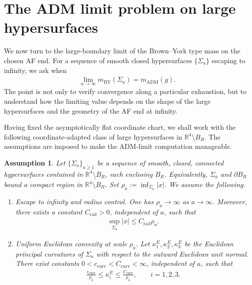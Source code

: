 \documentclass[10pt,a4paper]{amsart}
\newcommand{\R}{\mathbb{R}}
\newcommand{\ADM}{\mathrm{ADM}}
\newcommand{\BY}{\mathrm{BY}}
\newtheorem{assumption}[theorem]{Assumption}
\begin{document}
	\section{The ADM limit problem on large hypersurfaces}
	\label{sec:BY-large-hypersurfaces}
	
	We now turn to the large-boundary limit of the Brown--York type mass on the
	chosen AF end. For a sequence of smooth closed hypersurfaces $\{\Sigma_a\}$ escaping to infinity, we ask when
	\begin{align}
		\lim_{a\to\infty} m_{\BY}(\Sigma_a)
		=
		m_{\ADM}(g).
	\end{align}
	The point is not only to verify convergence along a particular exhaustion, but
	to understand how the limiting value depends on the shape of the large
	hypersurfaces and the geometry of the AF end at infinity.
	
	Having fixed the asymptotically flat coordinate chart, we shall work with the following coordinate-adapted class of large hypersurfaces in $\R^4\setminus B_R$. The assumptions are imposed to make the ADM-limit computation manageable.
	
	\begin{assumption}\label{ass:large-hypersurfaces}
		Let $\{\Sigma_a\}_{a\geq 1}$ be a sequence of smooth, closed, connected hypersurfaces contained in $\R^4\setminus B_R$, each enclosing $B_R$. Equivalently, $\Sigma_a$ and $\partial B_R$ bound a compact region in $\overline{\R^4\setminus B_R}$. Set
		$\rho_a:=\inf_{\Sigma_a}|x|$. We assume the following.
		
		\begin{enumerate}[label=\textup{(\arabic*)}]
			\item \emph{Escape to infinity and radius control.}
			One has $\rho_a\to\infty$ as $a\to\infty$. Moreover, there exists a
			constant $C_{\mathrm{rad}}>0$, independent of $a$, such that
			\begin{align}
				\sup_{\Sigma_a}|x|
				\leq
				C_{\mathrm{rad}}\rho_a .
			\end{align}
			
			\item \emph{Uniform Euclidean convexity at scale $\rho_a$.}
			Let $\kappa_1^E,\kappa_2^E,\kappa_3^E$ be the Euclidean principal
			curvatures of $\Sigma_a$ with respect to the outward Euclidean
			unit normal. There exist constants
			$0<c_{\mathrm{curv}}<C_{\mathrm{curv}}<\infty$, independent of $a$, such that
			\begin{align}\label{eq:large-hypersurface-curvature-control}
				\frac{c_{\mathrm{curv}}}{\rho_a}
				\leq
				\kappa_i^E
				\leq
				\frac{C_{\mathrm{curv}}}{\rho_a},
				\qquad
				i=1,2,3 .
			\end{align}
		\end{enumerate}
	\end{assumption}
	
\end{document}
